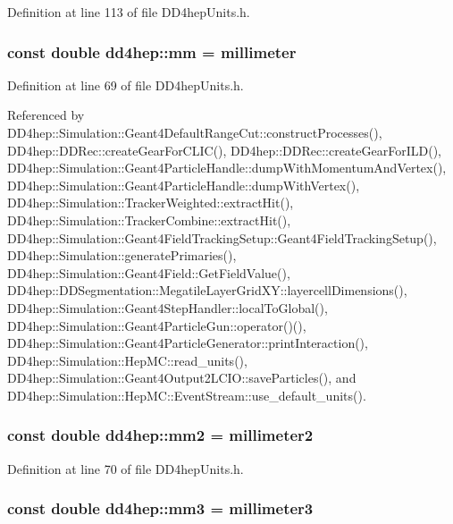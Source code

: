 Definition at line 113 of file DD4hepUnits.h.\hypertarget{namespacedd4hep_a124f4e9c11400c971e1a829ba8d4a3d0}{
\subsubsection[{mm}]{\setlength{\rightskip}{0pt plus 5cm}const double {\bf dd4hep::mm} = {\bf millimeter}}}
\label{namespacedd4hep_a124f4e9c11400c971e1a829ba8d4a3d0}


Definition at line 69 of file DD4hepUnits.h.

Referenced by DD4hep::Simulation::Geant4DefaultRangeCut::constructProcesses(), DD4hep::DDRec::createGearForCLIC(), DD4hep::DDRec::createGearForILD(), DD4hep::Simulation::Geant4ParticleHandle::dumpWithMomentumAndVertex(), DD4hep::Simulation::Geant4ParticleHandle::dumpWithVertex(), DD4hep::Simulation::TrackerWeighted::extractHit(), DD4hep::Simulation::TrackerCombine::extractHit(), DD4hep::Simulation::Geant4FieldTrackingSetup::Geant4FieldTrackingSetup(), DD4hep::Simulation::generatePrimaries(), DD4hep::Simulation::Geant4Field::GetFieldValue(), DD4hep::DDSegmentation::MegatileLayerGridXY::layercellDimensions(), DD4hep::Simulation::Geant4StepHandler::localToGlobal(), DD4hep::Simulation::Geant4ParticleGun::operator()(), DD4hep::Simulation::Geant4ParticleGenerator::printInteraction(), DD4hep::Simulation::HepMC::read\_\-units(), DD4hep::Simulation::Geant4Output2LCIO::saveParticles(), and DD4hep::Simulation::HepMC::EventStream::use\_\-default\_\-units().\hypertarget{namespacedd4hep_a637e0a0b1e9c316aa5581b95204d4fe3}{
\subsubsection[{mm2}]{\setlength{\rightskip}{0pt plus 5cm}const double {\bf dd4hep::mm2} = {\bf millimeter2}}}
\label{namespacedd4hep_a637e0a0b1e9c316aa5581b95204d4fe3}


Definition at line 70 of file DD4hepUnits.h.\hypertarget{namespacedd4hep_a7ca8a76450060a8f0aa5a0fe68a56b1b}{
\subsubsection[{mm3}]{\setlength{\rightskip}{0pt plus 5cm}const double {\bf dd4hep::mm3} = {\bf millimeter3}}}
\label{namespacedd4hep_a7ca8a76450060a8f0aa5a0fe68a56b1b}


